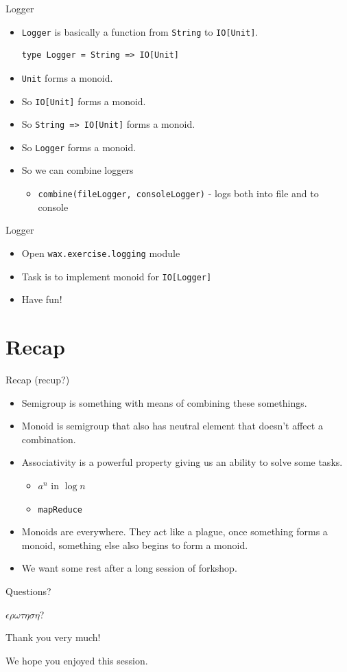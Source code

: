 \documentclass[presentation,aspectratio=169,smaller]{beamer}
\begin{document}
\begin{frame}[label={sec:org653777d},fragile]{Logger}
 \begin{itemize}
\item \texttt{Logger} is basically a function from \texttt{String} to \texttt{IO[Unit]}.
\begin{verbatim}
type Logger = String => IO[Unit]
\end{verbatim}
\item \texttt{Unit} forms a monoid.
\item So \texttt{IO[Unit]} forms a monoid.
\item So \texttt{String => IO[Unit]} forms a monoid.
\item So \texttt{Logger} forms a monoid.
\item So we can combine loggers
\begin{itemize}
\item \texttt{combine(fileLogger, consoleLogger)} - logs both into file and to console
\end{itemize}
\end{itemize}
\end{frame}

\begin{frame}[label={sec:org1a359b0},fragile]{Logger}
 \begin{itemize}
\item Open \texttt{wax.exercise.logging} module
\item Task is to implement monoid for \texttt{IO[Logger]}
\item Have fun!
\end{itemize}
\end{frame}

\section*{Recap}
\label{sec:orga0af0c0}

\begin{frame}[label={sec:orgb63f379},fragile]{Recap (recup?)}
 \begin{itemize}
\item Semigroup is something with means of combining these somethings.
\item Monoid is semigroup that also has neutral element that doesn't affect a combination.
\item Associativity is a powerful property giving us an ability to solve some tasks.
\begin{itemize}
\item \(a^n\) in \(\log n\)
\item \texttt{mapReduce}
\end{itemize}
\item Monoids are everywhere. They act like a plague, once something forms a monoid,
something else also begins to form a monoid.
\item We want some rest after a long session of forkshop.
\end{itemize}
\end{frame}

\begin{frame}[label={sec:orgf4a8dfb}]{Questions?}
\centerline{\huge $\epsilon \rho \omega \tau \eta \sigma \eta$?}
\end{frame}

\begin{frame}[label={sec:org0eacae5}]{Thank you very much!}
\centerline{\huge We hope you enjoyed this session.}
\end{frame}
\end{document}
